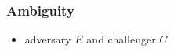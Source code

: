 \begin{frame}
	\frametitle{Ambiguity}

	\begin{itemize}
		\item adversary $E$ and challenger $C$
	\end{itemize}
\end{frame}